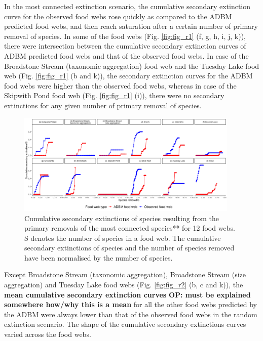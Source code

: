 \documentclass{article}
\begin{document}
In the most connected extinction scenario, the cumulative secondary
extinction curve for the observed food webs rose quickly as compared to
the ADBM predicted food webs, and then reach saturation after a certain
number of primary removal of species. In some of the food webs (Fig.
\ref{fig:fig_r1} (f, g, h, i, j, k)), there were intersection between
the cumulative secondary extinction curves of ADBM predicted food webs
and that of the observed food webs. In case of the Broadstone Stream
(taxonomic aggregation) food web and the Tuesday Lake food web (Fig.
\ref{fig:fig_r1} (b and k)), the secondary extinction curves for the
ADBM food webs were higher than the observed food webs, whereas in case
of the Skipwith Pond food web (Fig. \ref{fig:fig_r1} (i)), there were no
secondary extinctions for any given number of primary removal of
species.

\begin{figure}

{\centering \includegraphics[width=400px]{../results/plot_mostconnected} 

}

\caption{\label{fig:fig_r1} Cumulative secondary extinctions of species resulting from the primary removals of the most connected species** for 12 food webs. S denotes the number of species in a food web. The cumulative secondary extinctions of species and the number of species removed have been normalised by the number of species.}\label{fig:unnamed-chunk-2}
\end{figure}

Except Broadstone Stream (taxonomic aggregation), Broadstone Stream
(size aggregation) and Tuesday Lake food webs (Fig. \ref{fig:fig_r2} (b,
c and k)), the \textbf{mean cumulative secondary extinction curves}
\textbf{OP: must be explained somewhere how/why this is a mean} for all
the other food webs predicted by the ADBM were always lower than that of
the observed food webs in the random extinction scenario. The shape of
the cumulative secondary extinctions curves varied across the food webs.
\end{document}
